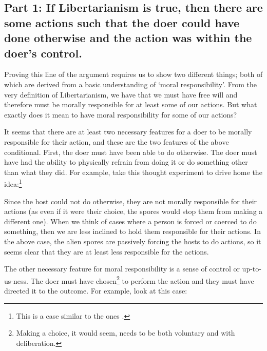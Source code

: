 \subsection{Part 1: If Libertarianism is true, then there are some actions such that the doer could have done otherwise and the action was within the doer's control.}

Proving this line of the argument requires us to show two different things; both of which are derived from a basic understanding of ‘moral responsibility'. From the very definition of Libertarianism, we have that we must have free will and therefore must be morally responsible for at least some of our actions. But what exactly does it mean to have moral responsibility for some of our actions?

It seems that there are at least two necessary features for a doer to be morally responsible for their action, and these are the two features of the above conditional. First, the doer must have been able to do otherwise. The doer must have had the ability to physically refrain from doing it or do something other than what they did. For example, take this thought experiment to drive home the idea:\footnote{This is a case similar to the ones \cite[found in][ ]{Frankfurt1} \cite[and][ ]{Fischer1}.}

Since the host could not do otherwise, they are not morally responsible for their actions (as even if it were their choice, the spores would stop them from making a different one). When we think of cases where a person is forced or coerced to do something, then we are less inclined to hold them responsible for their actions. In the above case, the alien spores are passively forcing the hosts to do actions, so it seems clear that they are at least less responsible for the actions.

The other necessary feature for moral responsibility is a sense of control or up-to-us-ness. The doer must have chosen\footnote{Making a choice, it would seem, needs to be both voluntary and with deliberation.} to perform the action and they must have directed it to the outcome. For example, look at this case:

